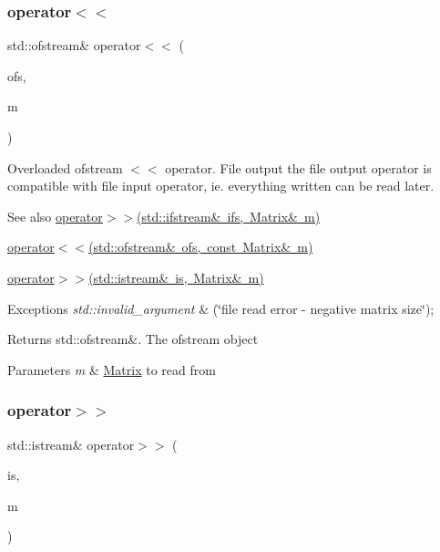 \subsubsection{\texorpdfstring{operator$<$$<$}{operator<<}\hspace{0.1cm}{\footnotesize\ttfamily [2/2]}}
{\footnotesize\ttfamily std\+::ofstream\& operator$<$$<$ (\begin{DoxyParamCaption}\item[{std\+::ofstream \&}]{ofs,  }\item[{const \mbox{\hyperlink{class_matrix}{Matrix}} \&}]{m }\end{DoxyParamCaption})\hspace{0.3cm}{\ttfamily [friend]}}

Overloaded ofstream $<$$<$ operator. File output the file output operator is compatible with file input operator, ie. everything written can be read later. \begin{DoxySeeAlso}{See also}
\mbox{\hyperlink{class_matrix_aa5699a0bdf0ee014f083ff8a76629d21}{operator$>$$>$(std\+::ifstream\& ifs, Matrix\& m)}} 

\mbox{\hyperlink{class_matrix_aa574249d63b390cf1108d6e82047ef61}{operator$<$$<$(std\+::ofstream\& ofs, const Matrix\& m)}} 

\mbox{\hyperlink{class_matrix_a3d6c1dcfc038804f4c08687f4f37f48b}{operator$>$$>$(std\+::istream\& is, Matrix\& m)}} 
\end{DoxySeeAlso}

\begin{DoxyExceptions}{Exceptions}
{\em std\+::invalid\+\_\+argument} & (\char`\"{}file read error -\/ negative matrix size\char`\"{}); \\
\hline
\end{DoxyExceptions}
\begin{DoxyReturn}{Returns}
std\+::ofstream\&. The ofstream object 
\end{DoxyReturn}

\begin{DoxyParams}{Parameters}
{\em m} & \mbox{\hyperlink{class_matrix}{Matrix}} to read from \\
\hline
\end{DoxyParams}
\mbox{\label{class_matrix_a3d6c1dcfc038804f4c08687f4f37f48b}} 
\subsubsection{\texorpdfstring{operator$>$$>$}{operator>>}\hspace{0.1cm}{\footnotesize\ttfamily [1/2]}}
{\footnotesize\ttfamily std\+::istream\& operator$>$$>$ (\begin{DoxyParamCaption}\item[{std\+::istream \&}]{is,  }\item[{\mbox{\hyperlink{class_matrix}{Matrix}} \&}]{m }\end{DoxyParamCaption})\hspace{0.3cm}{\ttfamily [friend]}}

